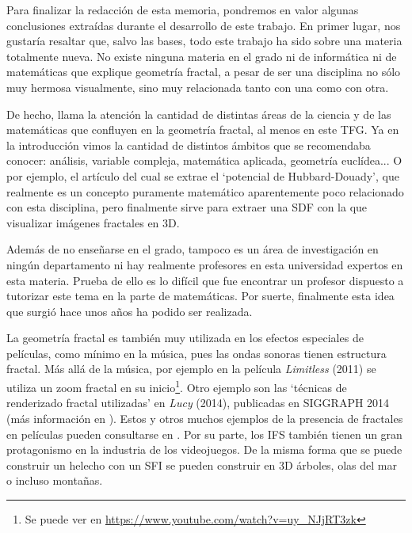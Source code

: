 %
%

Para finalizar la redacción de esta memoria, pondremos en valor algunas conclusiones extraídas durante el desarrollo de este trabajo. En primer lugar, nos gustaría resaltar que, salvo las bases, todo este trabajo ha sido sobre una materia totalmente nueva. No existe ninguna materia en el grado ni de informática ni de matemáticas que explique geometría fractal, a pesar de ser una disciplina no sólo muy hermosa visualmente, sino muy relacionada tanto con una como con otra.

De hecho, llama la atención la cantidad de distintas áreas de la ciencia y de las matemáticas que confluyen en la geometría fractal, al menos en este TFG. Ya en la introducción vimos la cantidad de distintos ámbitos que se recomendaba conocer: análisis, variable compleja, matemática aplicada, geometría euclídea... O por ejemplo, el artículo \cite{Hubbard-Douady} del cual se extrae el `potencial de Hubbard-Douady', que realmente es un concepto puramente matemático aparentemente poco relacionado con esta disciplina, pero finalmente sirve para extraer una SDF con la que visualizar imágenes fractales en 3D.

Además de no enseñarse en el grado, tampoco es un área de investigación en ningún departamento ni hay realmente profesores en esta universidad expertos en esta materia. Prueba de ello es lo difícil que fue encontrar un profesor dispuesto a tutorizar este tema en la parte de matemáticas. Por suerte, finalmente esta idea que surgió hace unos años ha podido ser realizada.

La geometría fractal es también muy utilizada en los efectos especiales de películas, como mínimo en la música, pues las ondas sonoras tienen estructura fractal. Más allá de la música, por ejemplo en la película \textit{Limitless} (2011) se utiliza un zoom fractal en su inicio\footnote{Se puede ver en \url{https://www.youtube.com/watch?v=uy_NJjRT3zk}}. Otro ejemplo son las `técnicas de renderizado fractal utilizadas' en \textit{Lucy} (2014), publicadas en SIGGRAPH 2014 (más información en \cite{SIGGRAPH-2014}). Estos y otros muchos ejemplos de la presencia de fractales en películas pueden consultarse en \cite{fractals-films}. Por su parte, los IFS también tienen un gran protagonismo en la industria de los videojuegos. De la misma forma que se puede construir un helecho con un SFI se pueden construir en 3D árboles, olas del mar o incluso montañas. 

